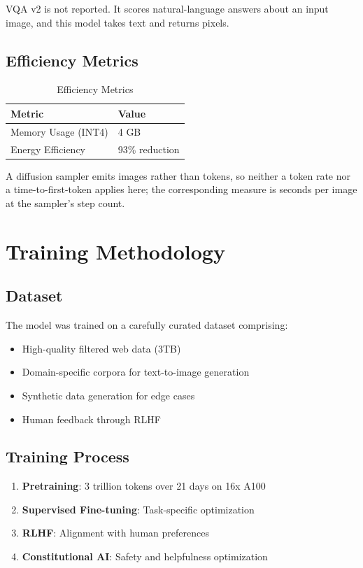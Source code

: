 \documentclass[11pt,a4paper]{article}
\begin{document}
VQA v2 is not reported. It scores natural-language answers about an input image,
and this model takes text and returns pixels.

\subsection{Efficiency Metrics}

\begin{table}[H]
\centering
\begin{tabular}{ll}
\toprule
\textbf{Metric} & \textbf{Value} \\
\midrule
Memory Usage (INT4) & 4 GB \\
Energy Efficiency & 93\% reduction \\
\bottomrule
\end{tabular}
\caption{Efficiency Metrics}
\end{table}

A diffusion sampler emits images rather than tokens, so neither a token rate nor a
time-to-first-token applies here; the corresponding measure is seconds per image at
the sampler's step count.


\section{Training Methodology}

\subsection{Dataset}
The model was trained on a carefully curated dataset comprising:
\begin{itemize}
    \item High-quality filtered web data (3TB)
    \item Domain-specific corpora for text-to-image generation
    \item Synthetic data generation for edge cases
    \item Human feedback through RLHF
\end{itemize}

\subsection{Training Process}
\begin{enumerate}
    \item \textbf{Pretraining}: 3 trillion tokens over 21 days on 16x A100
    \item \textbf{Supervised Fine-tuning}: Task-specific optimization
    \item \textbf{RLHF}: Alignment with human preferences
    \item \textbf{Constitutional AI}: Safety and helpfulness optimization
\end{enumerate}
\end{document}

